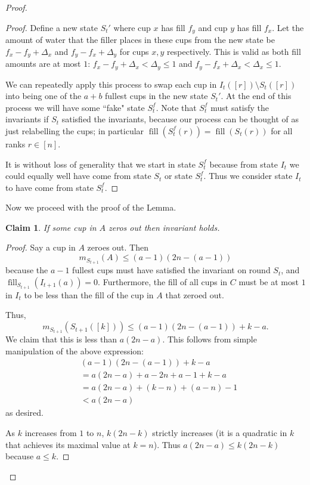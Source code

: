\documentclass[twocolumn]{article}[10pt]
\DeclareMathOperator{\fil}{\text{fill}}
\newtheorem{clm}{Claim}
\begin{document}
\begin{proof}
\begin{proof}
Define a new state $S_t'$ where cup $x$ has fill $f_y$ and cup $y$ has fill $f_x$. 
Let the amount of water that the filler places in these cups from the new state be
$f_x-f_y+\Delta_x$ and $f_y-f_x + \Delta_y$ for cups $x,y$ respectively.
This is valid as both fill amounts are at most $1$: $f_x-f_y+\Delta_x<\Delta_y
\le 1$ and $f_y-f_x + \Delta_x < \Delta_x \le 1$.

We can repeatedly apply this process to swap each cup in $I_t([r])\setminus
S_t([r])$ into being one of the $a+b$ fullest cups in the new state $S_t'$.
At the end of this process we will have some ``fake" state $S_t^f$. Note that
$S_t^f$ must satisfy the invariants if $S_t$ satisfied the invariants, because
our process can be thought of as just relabelling the cups; in particular
$\fil(S_t^f(r)) = \fil(S_t(r))$ for all ranks $r \in [n]$.

It is without loss of generality that we start in state $S_t^f$ because from
state $I_t$ we could equally well have come from state $S_t$ or state $S_t^f$.
Thus we consider state $I_t$ to have come from state $S_t^f$.
\end{proof}

Now we proceed with the proof of the Lemma.
\begin{clm}
  If some cup in $A$ zeros out then invariant holds.
\end{clm}
\begin{proof}
  Say a cup in $A$ zeroes out. Then 
  $$m_{S_{t+1}}(A) \le (a-1)(2n-(a-1))$$
  because the $a-1$ fullest cups must have satisfied the invariant on round
  $S_t$, and $\fil_{S_{t+1}}(I_{t+1}(a)) = 0$.
  Furthermore, the fill of all cups in $C$ must be at most $1$ in $I_t$ to be
  less than the fill of the cup in $A$ that zeroed out.

  Thus, 
  $$m_{S_{t+1}}(S_{t+1}([k])) \le (a-1)(2n-(a-1))+k-a.$$
  We claim that this is less than $a(2n-a)$. 
  This follows from simple manipulation of the above expression:
  \begin{align*}
    &(a-1)(2n-(a-1))+k-a\\
    &= a(2n-a) +a -2n+a-1 + k -a\\
    &= a(2n-a) + (k-n) + (a-n) -1\\
    &< a(2n-a)
  \end{align*}
  as desired.

  As $k$ increases from $1$ to $n$, $k(2n-k)$ strictly increases (it is a
  quadratic in $k$ that achieves its maximal value at $k=n$).
  Thus $a(2n-a) \le k(2n-k)$ because $a\le k$.


\end{proof}
\end{proof}
\end{document}
